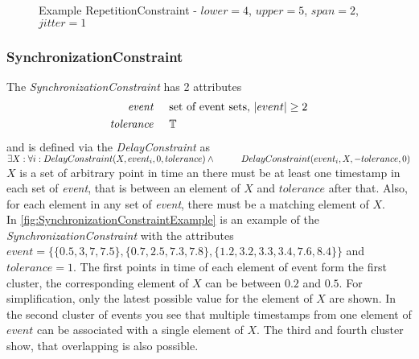 \begin{figure}
			\caption{Example RepetitionConstraint - $lower = 4$, $upper = 5$, $span = 2$, $jitter=1$}
			\label{fig:RepetitionConstraintExample}
		\end{figure}
		
	
	\subsubsection{SynchronizationConstraint}
		The \emph{SynchronizationConstraint} has 2 attributes
		\begin{align*}
			\emph{event} & \hspace{.5cm}\text{set of event sets, $|event|\geq 2$}\\
			\emph{tolerance} & \hspace{.5cm}\mathbb{T}
		\end{align*}
		and is defined via the \emph{DelayConstraint} as\\[10pt]
		\begin{math}
			\exists X: \forall i: DelayConstraint(X, event_i, 0, tolerance) \land\\
			\text{\hspace{1cm}}DelayConstraint(event_i, X, -tolerance, 0)
		\end{math}\\[10pt]
		$X$ is a set of arbitrary point in time an there must be at least one timestamp in each set of \emph{event}, that is between an element of $X$ and $tolerance$ after that. Also, for each element in any set of \emph{event}, there must be a matching element of $X$.\\
		In \ref{fig:SynchronizationConstraintExample} is an example of the \emph{SynchronizationConstraint} with the attributes $event=\{\{0.5, 3, 7, 7.5\}, \{0.7, 2.5, 7.3, 7.8\}, \{1.2, 3.2, 3.3, 3.4, 7.6, 8.4\}\}$ and $tolerance = 1$. The first points in time of each element of event form the first cluster, the corresponding element of $X$ can be between $0.2$ and $0.5$. For simplification, only the latest possible value for the element of $X$ are shown. In the second cluster of events you see that multiple timestamps from one element of $event$ can be associated with a single element of $X$. The third and fourth cluster show, that overlapping is also possible.
